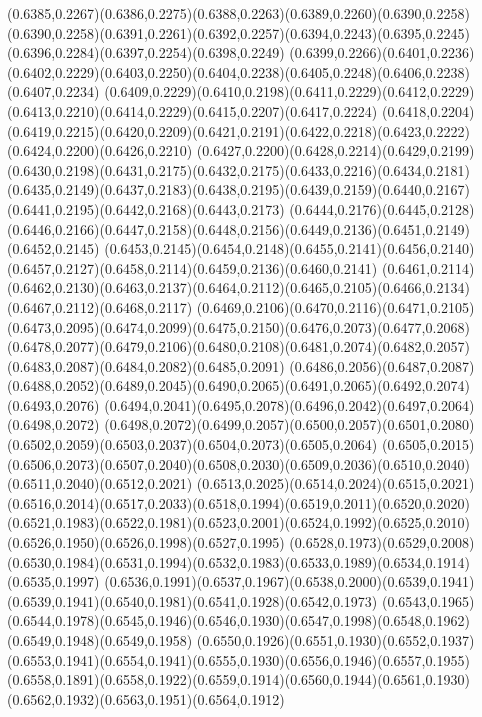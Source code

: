 (0.6385,0.2267)(0.6386,0.2275)(0.6388,0.2263)(0.6389,0.2260)(0.6390,0.2258)
\PST@Solid(0.6390,0.2258)(0.6391,0.2261)(0.6392,0.2257)(0.6394,0.2243)(0.6395,0.2245)(0.6396,0.2284)(0.6397,0.2254)(0.6398,0.2249)
(0.6399,0.2266)(0.6401,0.2236)(0.6402,0.2229)(0.6403,0.2250)(0.6404,0.2238)(0.6405,0.2248)(0.6406,0.2238)(0.6407,0.2234)
(0.6409,0.2229)(0.6410,0.2198)(0.6411,0.2229)(0.6412,0.2229)(0.6413,0.2210)(0.6414,0.2229)(0.6415,0.2207)(0.6417,0.2224)
(0.6418,0.2204)(0.6419,0.2215)(0.6420,0.2209)(0.6421,0.2191)(0.6422,0.2218)(0.6423,0.2222)(0.6424,0.2200)(0.6426,0.2210)
(0.6427,0.2200)(0.6428,0.2214)(0.6429,0.2199)(0.6430,0.2198)(0.6431,0.2175)(0.6432,0.2175)(0.6433,0.2216)(0.6434,0.2181)
(0.6435,0.2149)(0.6437,0.2183)(0.6438,0.2195)(0.6439,0.2159)(0.6440,0.2167)(0.6441,0.2195)(0.6442,0.2168)(0.6443,0.2173)
(0.6444,0.2176)(0.6445,0.2128)(0.6446,0.2166)(0.6447,0.2158)(0.6448,0.2156)(0.6449,0.2136)(0.6451,0.2149)(0.6452,0.2145)
(0.6453,0.2145)(0.6454,0.2148)(0.6455,0.2141)(0.6456,0.2140)(0.6457,0.2127)(0.6458,0.2114)(0.6459,0.2136)(0.6460,0.2141)
(0.6461,0.2114)(0.6462,0.2130)(0.6463,0.2137)(0.6464,0.2112)(0.6465,0.2105)(0.6466,0.2134)(0.6467,0.2112)(0.6468,0.2117)
(0.6469,0.2106)(0.6470,0.2116)(0.6471,0.2105)(0.6473,0.2095)(0.6474,0.2099)(0.6475,0.2150)(0.6476,0.2073)(0.6477,0.2068)
(0.6478,0.2077)(0.6479,0.2106)(0.6480,0.2108)(0.6481,0.2074)(0.6482,0.2057)(0.6483,0.2087)(0.6484,0.2082)(0.6485,0.2091)
(0.6486,0.2056)(0.6487,0.2087)(0.6488,0.2052)(0.6489,0.2045)(0.6490,0.2065)(0.6491,0.2065)(0.6492,0.2074)(0.6493,0.2076)
(0.6494,0.2041)(0.6495,0.2078)(0.6496,0.2042)(0.6497,0.2064)(0.6498,0.2072)
\PST@Solid(0.6498,0.2072)(0.6499,0.2057)(0.6500,0.2057)(0.6501,0.2080)(0.6502,0.2059)(0.6503,0.2037)(0.6504,0.2073)(0.6505,0.2064)
(0.6505,0.2015)(0.6506,0.2073)(0.6507,0.2040)(0.6508,0.2030)(0.6509,0.2036)(0.6510,0.2040)(0.6511,0.2040)(0.6512,0.2021)
(0.6513,0.2025)(0.6514,0.2024)(0.6515,0.2021)(0.6516,0.2014)(0.6517,0.2033)(0.6518,0.1994)(0.6519,0.2011)(0.6520,0.2020)
(0.6521,0.1983)(0.6522,0.1981)(0.6523,0.2001)(0.6524,0.1992)(0.6525,0.2010)(0.6526,0.1950)(0.6526,0.1998)(0.6527,0.1995)
(0.6528,0.1973)(0.6529,0.2008)(0.6530,0.1984)(0.6531,0.1994)(0.6532,0.1983)(0.6533,0.1989)(0.6534,0.1914)(0.6535,0.1997)
(0.6536,0.1991)(0.6537,0.1967)(0.6538,0.2000)(0.6539,0.1941)(0.6539,0.1941)(0.6540,0.1981)(0.6541,0.1928)(0.6542,0.1973)
(0.6543,0.1965)(0.6544,0.1978)(0.6545,0.1946)(0.6546,0.1930)(0.6547,0.1998)(0.6548,0.1962)(0.6549,0.1948)(0.6549,0.1958)
(0.6550,0.1926)(0.6551,0.1930)(0.6552,0.1937)(0.6553,0.1941)(0.6554,0.1941)(0.6555,0.1930)(0.6556,0.1946)(0.6557,0.1955)
(0.6558,0.1891)(0.6558,0.1922)(0.6559,0.1914)(0.6560,0.1944)(0.6561,0.1930)(0.6562,0.1932)(0.6563,0.1951)(0.6564,0.1912)
